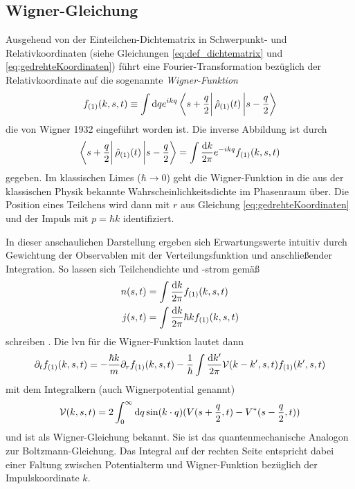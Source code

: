 \subsection{Wigner-Gleichung}\label{sec:wigner}
Ausgehend von der Einteilchen-Dichtematrix in Schwerpunkt- und Relativkoordinaten (siehe Gleichungen \eqref{eq:def_dichtematrix} und \eqref{eq:gedrehteKoordinaten}) führt eine Fourier-Transformation bezüglich der Relativkoordinate auf die sogenannte \emph{Wigner-Funktion}
\begin{equation}
  f_{(1)}(k,s,t) \equiv \int \mathop{}\!\mathrm{d} q e^{ikq}\bra{s+\frac{q}{2}}\hat{\rho}_{(1)}(t)\ket{s-\frac{q}{2}}
  \label{eq:fourier_wigner}
\end{equation}
die von Wigner \cite{wigner} 1932 eingeführt worden ist. Die inverse Abbildung ist durch
\begin{equation}
  \bra{s+\frac{q}{2}}\hat{\rho}_{(1)}(t)\ket{s-\frac{q}{2}} = \int \frac{\mathop{}\!\mathrm{d} k}{2\pi}e^{-ikq} f_{(1)}(k,s,t)
  \label{eq:fourier_wigner_invers}
\end{equation}
gegeben. Im klassischen Limes ($\hbar \rightarrow 0$) geht die Wigner-Funktion in die aus der klassischen Physik bekannte Wahrscheinlichkeitsdichte im Phasenraum über. Die Position eines Teilchens wird dann mit $r$ aus Gleichung \eqref{eq:gedrehteKoordinaten} und der Impuls mit $p=\hbar k$ identifiziert.

In dieser anschaulichen Darstellung ergeben sich Erwartungswerte intuitiv durch Gewichtung der Observablen mit der Verteilungsfunktion und anschließender Integration. So lassen sich Teilchendichte und -strom gemäß
\begin{align}
  n(s,t) &= \int \frac{\mathop{}\!\mathrm{d} k}{2\pi}f_{(1)}(k,s,t) \label{eq:wigner_n}\\
  j(s,t) &= \int \frac{\mathop{}\!\mathrm{d} k}{2\pi}\hbar k f_{(1)}(k,s,t) \label{eq:wigner_j}
\end{align}
schreiben \cite{modern}. Die \ac{lvn} für die Wigner-Funktion lautet dann \cite{frensley2, failure}
\begin{equation}
  \partial_t f_{(1)}(k,s,t) = -\frac{\hbar k}{m}\partial_r f_{(1)}(k,s,t) - \frac{1}{\hbar} \int \frac{\mathop{}\!\mathrm{d} k'}{2\pi}\mathcal{V}(k-k',s,t)f_{(1)}(k',s,t)
  \label{eq:wigner}
\end{equation}
mit dem Integralkern (auch Wignerpotential genannt)
\begin{equation*}
  \mathcal{V}(k,s,t) = 2\int_0^{\infty} \mathop{}\!\mathrm{d} q \sin(k\cdot q) (V(s+\frac{q}{2},t) - V^*(s-\frac{q}{2},t))
\end{equation*}
und ist als Wigner-Gleichung bekannt. Sie ist das quantenmechanische Analogon zur Boltzmann-Gleichung. Das Integral auf der rechten Seite entspricht dabei einer Faltung zwischen Potentialterm und Wigner-Funktion bezüglich der Impulskoordinate $k$.



